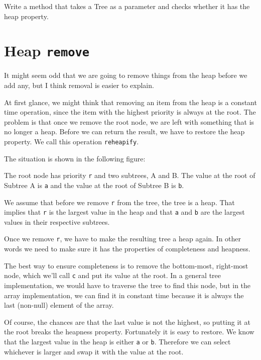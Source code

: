 \begin{exercise}
Write a method that takes a Tree as a parameter and checks
whether it has the heap property.
\end{exercise}


\section{Heap {\tt remove}}

It might seem odd that we are going to remove things from the
heap before we add any, but I think removal is easier
to explain.

At first glance, we might think that removing an item from the
heap is a constant time operation, since the item with
the highest priority is always at the root.  The problem is that
once we remove the root node, we are left with something that
is no longer a heap.  Before we can return the result, we have
to restore the heap property.  We call this operation
{\tt reheapify}.

The situation is shown in the following figure:
 
 
The root node has priority {\tt r} and two subtrees, A and B.
The value at the root of Subtree A is {\tt a} and the value at
the root of Subtree B is {\tt b}.

We assume that before we remove {\tt r} from the tree, the
tree is a heap.  That implies that {\tt r} is the largest value
in the heap and that {\tt a} and {\tt b} are the largest values
in their respective subtrees.

Once we remove {\tt r}, we have to make the resulting tree
a heap again.  In other words we need to make sure it has
the properties of completeness and heapness.

The best way to ensure completeness is to remove the bottom-most,
right-most node, which we'll call {\tt c} and put its value at the
root.  In a general tree implementation, we would have to traverse the
tree to find this node, but in the array implementation, we can find
it in constant time because it is always the last (non-null) element
of the array.

Of course, the chances are that the last value is not the highest,
so putting it at the root breaks the heapness property.  Fortunately
it is easy to restore.  We know that the largest value in the
heap is either {\tt a} or {\tt b}.  Therefore we can select whichever
is larger and swap it with the value at the root.

